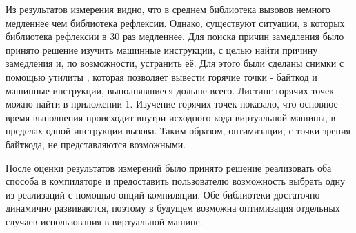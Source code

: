 Из результатов измерения видно, что в среднем библиотека вызовов немного медленнее чем библиотека рефлексии. Однако, существуют ситуации, в которых библиотека рефлексии в 30 раз медленнее. Для поиска причин замедления было принято решение изучить машинные инструкции, с целью найти причину замедления и, по возможности, устранить её. Для этого были сделаны снимки с помощью утилиты , которая позволяет вывести горячие точки - байткод и машинные инструкции, выполнявшиеся дольше всего. Листинг горячих точек можно найти в приложении 1. Изучение горячих точек показало, что основное время выполнения происходит внутри исходного кода виртуальной машины, в пределах одной инструкции вызова. Таким образом, оптимизации, с точки зрения байткода, не представляются возможными.

После оценки результатов измерений было принято решение реализовать оба способа в компиляторе и предоставить пользователю возможность выбрать одну из реализаций с помощью опций компиляции. Обе библиотеки достаточно динамично развиваются, поэтому в будущем возможна оптимизация отдельных случаев использования в виртуальной машине.
